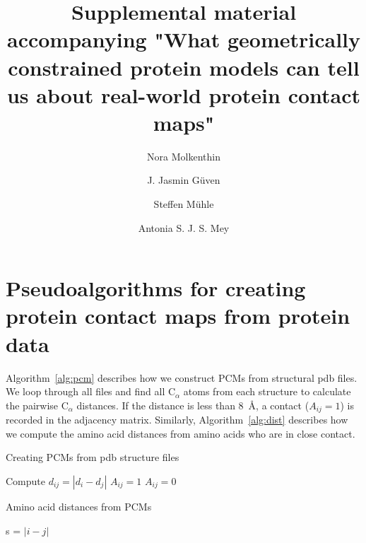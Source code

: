 \documentclass[notitlepage,
reprint,%
onecolumn,
amsmath,amssymb,superscriptaddress,aps,
pre,floatfix]{revtex4-1}
\begin{document}
\title{Supplemental material accompanying "What geometrically constrained protein models can tell us about real-world protein contact maps"}
\author{Nora Molkenthin}
\author{J. Jasmin  Güven}
\author{Steffen Mühle}
\author{Antonia S. J. S. Mey}
\maketitle

\section*{Pseudoalgorithms for creating protein contact maps from protein data}

Algorithm~\ref{alg:pcm} describes how we construct PCMs from structural pdb files. We loop through all files and find all C$_\alpha$ atoms from each structure to calculate the pairwise C$_\alpha$ distances. If the distance is less than 8~Å, a contact ($A_{ij}=1$) is recorded in the adjacency matrix. Similarly, Algorithm~\ref{alg:dist} describes how we compute the amino acid distances from amino acids who are in close contact.
 
\begin{algorithm}[htb]
\caption{Creating PCMs from pdb structure files}\label{alg:pcm}
\begin{algorithmic}[1]
\State Compute $d_{ij}=|d_i-d_j|$ 
    \State \texttt{$A_{ij}=1$} 
\Else
    \State \texttt{$A_{ij}=0$} 
\EndIf
\EndFor
\EndFor
\end{algorithmic}
\end{algorithm}

\begin{algorithm}[htb]
\caption{Amino acid distances from PCMs}\label{alg:dist}
\begin{algorithmic}[1]
 
    \State s = $|i - j|$
\EndIf
\EndFor
\EndFor
\end{algorithmic}
\end{algorithm}
\end{document}
